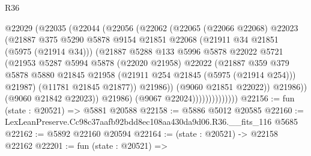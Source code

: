 \begin{lexlean}{R36}
\begin{coremodule}
                            @22029
                              (@22035
                                (@22044
                                  (@22056
                                    (@22062
                                      (@22065
                                        (@22066 @22068)
                                        @22023
                                        (@21887
                                          @375
                                          @5290
                                          @5878
                                          @9154
                                          @21851
                                          @22068
                                          (@21911 @34 @21851 (@5975 (@21914 @34)))
                                          (@21887
                                            @5288
                                            @133
                                            @5996
                                            @5878
                                            @22022
                                            @5721
                                            (@21953
                                              @5287
                                              @5994
                                              @5878
                                              (@22020 @21958)
                                              @22022
                                              (@21887
                                                @359
                                                @379
                                                @5878
                                                @5880
                                                @21845
                                                @21958
                                                (@21911 @254 @21845 (@5975 (@21914 @254)))
                                                @21987)
                                              (@11781 @21845 @21877))
                                            @21986))
                                        (@9060 @21851 @22022))
                                      @21986))
                                  (@9060 @21842 @22023))
                                @21986)
                              (@9067 @22024))))))))))))))
@22156 := fun (state : @20521) => @5881 @20588
@22158 := @5886 @5012 @20585
@22160 := LexLeanPreserve.Cc98c37aafb92bdd8ec108aa430da9d06.R36.__fits_116 @5685
@22162 := @5892 @22160 @20594
@22164 := (state : @20521) -> @22158 @22162
@22201 := fun (state : @20521) =>

\end{coremodule}
\end{lexlean}
